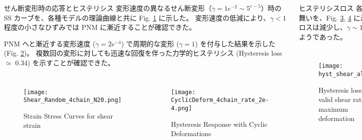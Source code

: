 \begin{columns}[totalwidth=.85\linewidth]
	\column{\textwidth}

		\begin{itembox}[l]{せん断変形時の応答とヒステリシス}
			変形速度の異なるせん断変形（$\dot{\gamma} = 1e^{-2} \sim 5^{e-5}$）時の SS カーブを、各種モデルの理論曲線と共に Fig. \ref{deform} に示した。
			変形速度の低減により、$\gamma<1$ 程度の小さなひずみでは PNM に漸近することが確認できた。

			PNM へと漸近する変形速度 ($\dot{\gamma} = 2e^{-4}$) で周期的な変形 ($\gamma = 1$) を付与した結果を示した (Fig. \ref{cyclic})。
			複数回の変形に対しても迅速な回復を伴った力学的ヒステリシス (Hysteresis loss $\simeq$ 0.34) を示すことが確認できた。
			\begin{columns}[totalwidth=\linewidth]
				\begin{figure}[htb]
					\centering
						\texttt{[image: Shear\_Random\_4chain\_N20.png]}
						\caption{Strain Stress Curves for shear strain}
						\label{deform}
				\end{figure}
				\begin{figure}[htb]
					\centering
						\texttt{[image: CyclicDeform\_4chain\_rate\_2e-4.png]}
						\caption{Hysteresis Response with Cyclic Deformations}
						\label{cyclic}
				\end{figure}
				\end{columns}
		\end{itembox}

		\begin{itembox}[l]{ヒステリシスロス}
			各種の変形条件での力学的ヒステリシスの振る舞いを、Fig. \ref{hystall}, \ref{hystallcomp} に示した。
			変形速度の低下に伴いヒステリシスロスは減少し、$\dot{\gamma} \sim 1e^{-5}$ 程度のオーダーの時間スケールで消失するようであった。
			\begin{columns}[totalwidth=\linewidth]
					\begin{figure}[htb]
						\centering
							\texttt{[image: hyst\_shear\_all.png]}
							\caption{Hysteresis losses for valid shear rate and maximum deformation}
							\label{hystall}
					\end{figure}
				\begin{figure}[htb]
					\centering
						\texttt{[image: hyst\_shear.png]}
						\caption{Comparison of Hysteresis losses}
						\label{hystallcomp}
				\end{figure}
				\end{columns}
		\end{itembox}


\end{columns}
